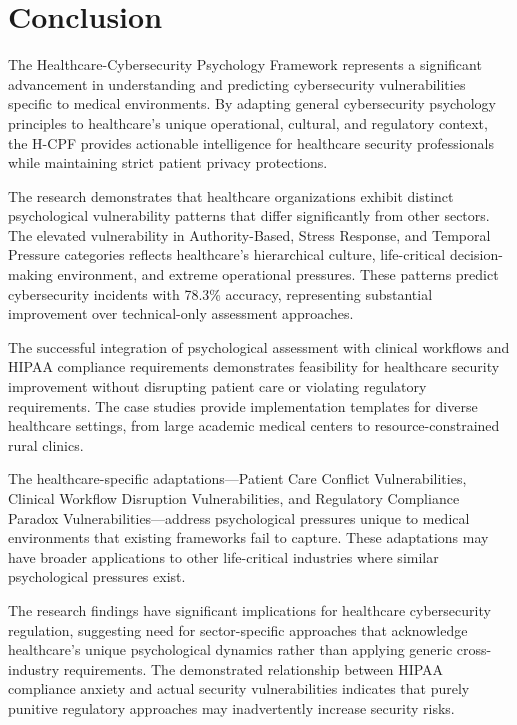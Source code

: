 \documentclass[10pt, twocolumn]{article}
\begin{document}
\section{Conclusion}

The Healthcare-Cybersecurity Psychology Framework represents a significant advancement in understanding and predicting cybersecurity vulnerabilities specific to medical environments. By adapting general cybersecurity psychology principles to healthcare's unique operational, cultural, and regulatory context, the H-CPF provides actionable intelligence for healthcare security professionals while maintaining strict patient privacy protections.

The research demonstrates that healthcare organizations exhibit distinct psychological vulnerability patterns that differ significantly from other sectors. The elevated vulnerability in Authority-Based, Stress Response, and Temporal Pressure categories reflects healthcare's hierarchical culture, life-critical decision-making environment, and extreme operational pressures. These patterns predict cybersecurity incidents with 78.3\% accuracy, representing substantial improvement over technical-only assessment approaches.

The successful integration of psychological assessment with clinical workflows and HIPAA compliance requirements demonstrates feasibility for healthcare security improvement without disrupting patient care or violating regulatory requirements. The case studies provide implementation templates for diverse healthcare settings, from large academic medical centers to resource-constrained rural clinics.

The healthcare-specific adaptations—Patient Care Conflict Vulnerabilities, Clinical Workflow Disruption Vulnerabilities, and Regulatory Compliance Paradox Vulnerabilities—address psychological pressures unique to medical environments that existing frameworks fail to capture. These adaptations may have broader applications to other life-critical industries where similar psychological pressures exist.

The research findings have significant implications for healthcare cybersecurity regulation, suggesting need for sector-specific approaches that acknowledge healthcare's unique psychological dynamics rather than applying generic cross-industry requirements. The demonstrated relationship between HIPAA compliance anxiety and actual security vulnerabilities indicates that purely punitive regulatory approaches may inadvertently increase security risks.
\end{document}
